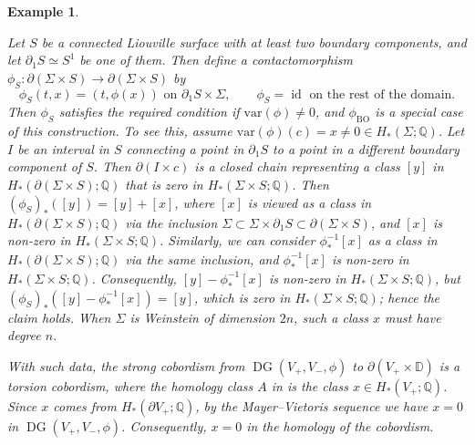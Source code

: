 \documentclass[11pt]{amsart}
\numberwithin{equation}{section}
\newtheorem{example}[theorem]{\textbf{Example}}
\def\D{{\mathbb D}}
\def\Q{{\mathbb Q}}
\DeclareMathOperator{\Id}{id}
\DeclareMathOperator{\BO}{BO}
\DeclareMathOperator{\DG}{DG}
\begin{document}
\begin{example}
\begin{enumerate}
        Let $S$ be a connected Liouville surface with at least two boundary components, and let $\partial_1S\simeq S^1$ be one of them. Then define a contactomorphism $\phi_S:\partial(\Sigma\times S) \to \partial(\Sigma\times S)$ by
        $$\phi_S (t,x)=(t,\phi(x)) \text{ on } \partial_1 S\times \Sigma, \qquad \phi_S = \Id \text{ on the rest of the domain.}$$
        Then $\phi_{S}$ satisfies the required condition if $\mathrm{var}(\phi)\ne 0$, and $\phi_{\BO}$ is a special case of this construction. To see this, assume $\mathrm{var}(\phi)(c)=x\ne 0 \in H_*(\Sigma;\Q)$. Let $I$ be an interval in $S$ connecting a point in $\partial_1S$ to a point in a different boundary component of $S$. Then $\partial(I\times c)$ is a closed chain representing a class $[y]$ in $H_*(\partial(\Sigma\times S);\Q)$ that is zero in $H_*(\Sigma\times S;\Q)$. Then $(\phi_S)_*([y])=[y]+[x]$, where $[x]$ is viewed as a class in $H_*(\partial(\Sigma \times S);\Q)$ via the inclusion $\Sigma \subset \Sigma \times \partial_1S \subset \partial(\Sigma\times S)$, and $[x]$ is non-zero in $H_*(\Sigma \times S;\Q)$. Similarly, we can consider $\phi^{-1}_*[x]$ as a class in $H_*(\partial(\Sigma \times S);\Q)$ via the same inclusion, and $\phi^{-1}_*[x]$ is non-zero in $H_*(\Sigma \times S;\Q)$. Consequently, $[y]-\phi^{-1}_*[x]$ is non-zero in $H_*(\Sigma\times S;\Q)$, but $(\phi_S)_*([y]-\phi^{-1}_*[x])=[y]$, which is zero in $H_*(\Sigma\times S;\Q)$; hence the claim holds. When $\Sigma$ is Weinstein of dimension $2n$, such a class $x$ must have degree $n$.
    \end{enumerate}
    With such data, the strong cobordism from $\DG(V_+,V_-,\phi)$ to $\partial(V_+\times \D)$ is a torsion cobordism, where the homology class $A$ in  is the class $x\in H_*(V_+;\Q)$. Since $x$ comes from $H_*(\partial V_+;\Q)$, by the Mayer--Vietoris sequence we have $x=0$ in $\DG(V_+,V_-,\phi)$. Consequently, $x=0$ in the homology of the cobordism. 
\end{example}
\end{document}
